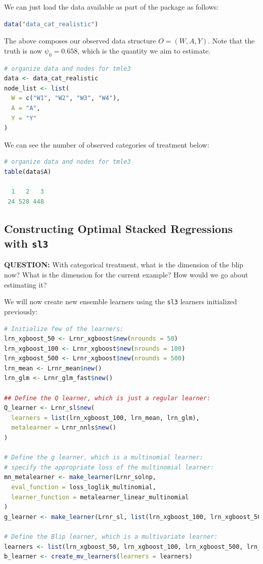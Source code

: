 \documentclass[
  12pt, krantz2,
]{krantz}
\newcommand{\passthrough}[1]{#1}
\newcommand{\1}{\mathbbm{1}}
\theoremstyle{definition}
\theoremstyle{definition}
\theoremstyle{definition}
\theoremstyle{definition}
\theoremstyle{remark}
\begin{document}
We can just load the data available as part of the package as follows:

\begin{lstlisting}[language=R]
data("data_cat_realistic")
\end{lstlisting}

The above composes our observed data structure \(O = (W, A, Y)\). Note that the
truth is now \(\psi_0=0.658\), which is the quantity we aim to estimate.

\begin{lstlisting}[language=R]
# organize data and nodes for tmle3
data <- data_cat_realistic
node_list <- list(
  W = c("W1", "W2", "W3", "W4"),
  A = "A",
  Y = "Y"
)
\end{lstlisting}

We can see the number of observed categories of treatment below:

\begin{lstlisting}[language=R]
# organize data and nodes for tmle3
table(data$A)

  1   2   3 
 24 528 448 
\end{lstlisting}

\hypertarget{constructing-optimal-stacked-regressions-with-sl3-1}{%
\subsection{\texorpdfstring{Constructing Optimal Stacked Regressions with \texttt{sl3}}{Constructing Optimal Stacked Regressions with sl3}}\label{constructing-optimal-stacked-regressions-with-sl3-1}}

\textbf{QUESTION:} With categorical treatment, what is the dimension of the blip now?
What is the dimension for the current example? How would we go about estimating it?

We will now create new ensemble learners using the
\passthrough{\lstinline!sl3!} learners initialized previously:

\begin{lstlisting}[language=R]
# Initialize few of the learners:
lrn_xgboost_50 <- Lrnr_xgboost$new(nrounds = 50)
lrn_xgboost_100 <- Lrnr_xgboost$new(nrounds = 100)
lrn_xgboost_500 <- Lrnr_xgboost$new(nrounds = 500)
lrn_mean <- Lrnr_mean$new()
lrn_glm <- Lrnr_glm_fast$new()

## Define the Q learner, which is just a regular learner:
Q_learner <- Lrnr_sl$new(
  learners = list(lrn_xgboost_100, lrn_mean, lrn_glm),
  metalearner = Lrnr_nnls$new()
)

# Define the g learner, which is a multinomial learner:
# specify the appropriate loss of the multinomial learner:
mn_metalearner <- make_learner(Lrnr_solnp,
  eval_function = loss_loglik_multinomial,
  learner_function = metalearner_linear_multinomial
)
g_learner <- make_learner(Lrnr_sl, list(lrn_xgboost_100, lrn_xgboost_500, lrn_mean), mn_metalearner)

# Define the Blip learner, which is a multivariate learner:
learners <- list(lrn_xgboost_50, lrn_xgboost_100, lrn_xgboost_500, lrn_mean, lrn_glm)
b_learner <- create_mv_learners(learners = learners)
\end{lstlisting}
\end{document}
